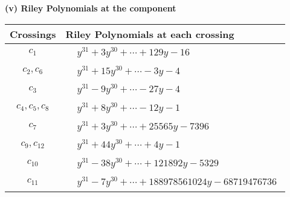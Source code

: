 \documentclass[1p]{elsarticle_modified}
\theoremstyle{definition}
\begin{document}
\newpage\renewcommand{\arraystretch}{1}
\flushleft \textbf{(v) Riley Polynomials at the component}\newline \\
\begin{tabular}{m{50pt}|m{274pt}}
Crossings & \hspace{64pt}Riley Polynomials at each crossing \\
\hline $$\begin{aligned}c_{1}\end{aligned}$$&$\begin{aligned}
&y^{31}+3 y^{30}+\cdots+129 y-16
\end{aligned}$\\
\hline $$\begin{aligned}c_{2},c_{6}\end{aligned}$$&$\begin{aligned}
&y^{31}+15 y^{30}+\cdots-3 y-4
\end{aligned}$\\
\hline $$\begin{aligned}c_{3}\end{aligned}$$&$\begin{aligned}
&y^{31}-9 y^{30}+\cdots-27 y-4
\end{aligned}$\\
\hline $$\begin{aligned}c_{4},c_{5},c_{8}\end{aligned}$$&$\begin{aligned}
&y^{31}+8 y^{30}+\cdots-12 y-1
\end{aligned}$\\
\hline $$\begin{aligned}c_{7}\end{aligned}$$&$\begin{aligned}
&y^{31}+3 y^{30}+\cdots+25565 y-7396
\end{aligned}$\\
\hline $$\begin{aligned}c_{9},c_{12}\end{aligned}$$&$\begin{aligned}
&y^{31}+44 y^{30}+\cdots+4 y-1
\end{aligned}$\\
\hline $$\begin{aligned}c_{10}\end{aligned}$$&$\begin{aligned}
&y^{31}-38 y^{30}+\cdots+121892 y-5329
\end{aligned}$\\
\hline $$\begin{aligned}c_{11}\end{aligned}$$&$\begin{aligned}
&y^{31}-7 y^{30}+\cdots+188978561024 y-68719476736
\end{aligned}$\\
\hline
\end{tabular}\\~\\
\end{document}
